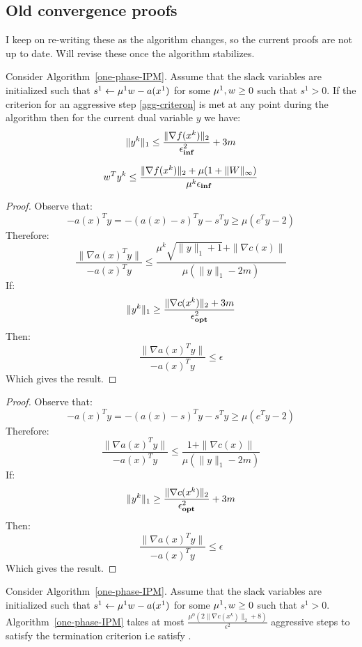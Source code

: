 \documentclass{article}
\begin{document}
\subsection{Old convergence proofs}


I keep on re-writing these as the algorithm changes, so the current proofs are not up to date. Will revise these once the algorithm stabilizes.

\newcommand{\algBlurb}{Consider Algorithm~\ref{one-phase-IPM}.
Assume that the slack variables are initialized such that $s^{1} \gets \vioVar^{1} \conWeight - a(x^{1})$ for some $\vioVar^{1}, \conWeight \ge 0$ such that $s^{1} > 0$.}

\begin{lemma}
\algBlurb{}
If the criterion for an aggressive step \eqref{agg-criteron} is met at any point during the algorithm then for the current dual variable $y$ we have:
$$
\| y^k \|_{1} \le \frac{\| \nabla f(x^{k}) \|_{2}}{\epsilon_{\textbf{inf}}^2} + 3 m
$$

$$
w^T y^k \le \frac{ \| \nabla f(x^{k}) \|_{2} + \mu (1 + \| W \|_{\infty} )}{ \mu^k \epsilon_{\textbf{inf}} }
$$
\end{lemma}

\begin{proof}
Observe that:
$$-a(x)^T y = -(a(x) - s)^T y - s^T y \ge  \mu (e^T y - 2)$$
Therefore:
$$
\frac{\| \nabla a(x)^T y \|}{-a(x)^T y} \le \frac{\mu^k \sqrt{ \| y \|_{1} + 1} + \| \nabla c(x) \|}{\mu ( \| y \|_{1} - 2 m )} 
$$
If:
$$
\| y^k \|_{1} \ge \frac{\| \nabla c(x^{k}) \|_{2} +  3 m}{\epsilon_{\textbf{opt}}^2} 
$$
Then:
$$
\frac{\| \nabla a(x)^T y \|}{-a(x)^T y} \le \epsilon 
$$
Which gives the result.
\end{proof}

\begin{proof}
Observe that:
$$-a(x)^T y = -(a(x) - s)^T y - s^T y \ge  \mu (e^T y - 2)$$
Therefore:
$$
\frac{\| \nabla a(x)^T y \|}{-a(x)^T y} \le \frac{1+ \| \nabla c(x) \|}{\mu ( \| y \|_{1} - 2 m )} 
$$
If:
$$
\| y^k \|_{1} \ge \frac{\| \nabla c(x^{k}) \|_{2}}{\epsilon_{\textbf{opt}}^2} +  3 m
$$
Then:
$$
\frac{\| \nabla a(x)^T y \|}{-a(x)^T y} \le \epsilon 
$$
Which gives the result.
\end{proof}

\begin{lemma}
\algBlurb{}
Algorithm~\ref{one-phase-IPM} takes at most $\frac{\mu^{0} (2 \| \nabla c(x^{k}) \|_{2} + 8)}{\epsilon^2}$ aggressive steps to satisfy the termination criterion i.e satisfy \termination{}.
\end{lemma}
\end{document}
